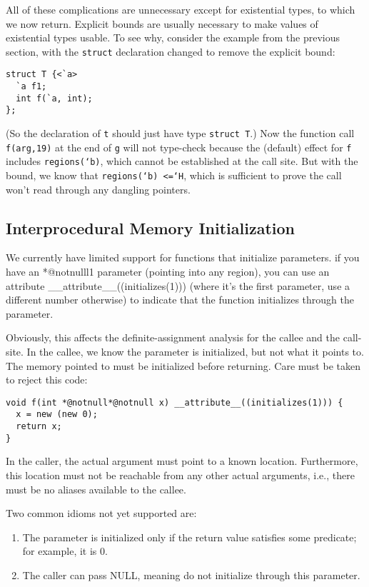 All of these complications are unnecessary except for existential
types, to which we now return.  Explicit bounds are usually necessary
to make values of existential types usable.  To see why, consider the
example from the previous section, with the \texttt{struct}
declaration changed to remove the explicit bound:
\begin{verbatim}  
struct T {<`a> 
  `a f1; 
  int f(`a, int); 
};
\end{verbatim}
(So the declaration of \texttt{t} should just have type \texttt{struct
  T}.)  Now the function call \texttt{f(arg,19)} at the end of
\texttt{g} will not type-check because the (default) effect for
\texttt{f} includes \texttt{regions(`b)}, which cannot be established
at the call site.  But with the bound, we know that
  \texttt{regions(`b) <=`H}, which is sufficient to prove the call
  won't read through any dangling pointers.

\subsection{Interprocedural Memory Initialization}

We currently have limited support for functions that initialize
parameters.  if you have an *@notnulll{1} parameter (pointing into any region),
you can use an attribute __attribute__((initializes(1))) (where it's
the first parameter, use a different number otherwise) to indicate
that the function initializes through the parameter.
        
Obviously, this affects the definite-assignment analysis for the
callee and the call-site.  In the callee, we know the parameter is
initialized, but not what it points to.  The memory pointed to must be
initialized before returning.  Care must be taken to reject this code:
\begin{verbatim}
void f(int *@notnull*@notnull x) __attribute__((initializes(1))) { 
  x = new (new 0); 
  return x; 
}
\end{verbatim}
In the caller, the actual argument must point to a known location.
Furthermore, this location must not be reachable from any other actual
arguments, i.e., there must be no aliases available to the callee.

Two common idioms not yet supported are: 
\begin{enumerate}
\item The parameter is
initialized only if the return value satisfies some predicate; for
example, it is 0.
\item The caller can pass NULL, meaning do not initialize through this
  parameter.
\end{enumerate}
